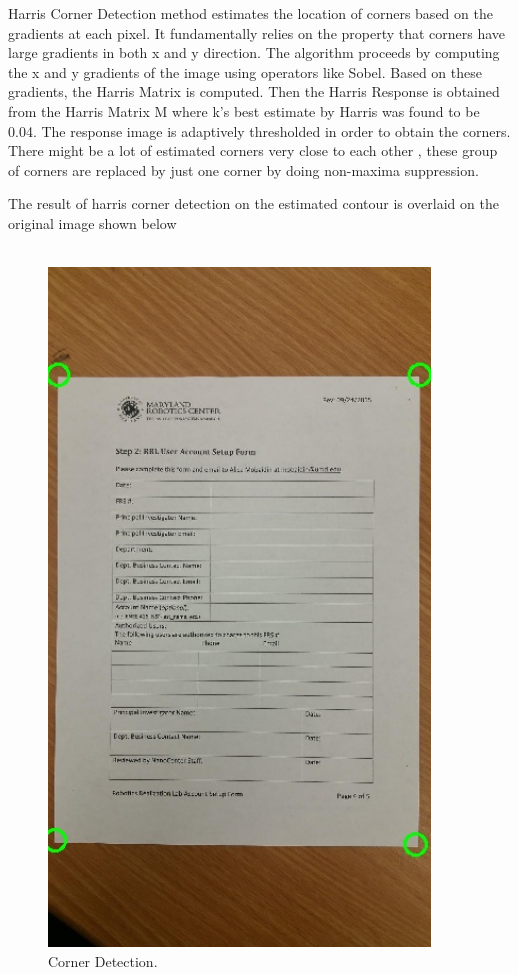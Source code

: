 Harris Corner Detection method estimates the location of corners based on the gradients at each pixel. It fundamentally relies on the property that corners have large gradients in both x and y direction. The algorithm proceeds by computing the x and y gradients of the image using operators like Sobel. Based on these gradients, the Harris Matrix is computed. Then the Harris Response is obtained from the Harris Matrix M where k's best estimate by Harris was found to be 0.04. The response image is adaptively thresholded in order to obtain the corners. There might be a lot of estimated corners very close to each other , these group of corners are replaced by just one corner by doing non-maxima suppression. 

\pagebreak

The result of harris corner detection on the estimated contour is overlaid on the original image shown below \\ \\

\begin{figure}[th]
	\centering
	\includegraphics[height=18cm ]{Figures/corner_detection}
	\caption[Corner Detection]{Corner Detection.}
	\label{fig:CornerDetection}
\end{figure}

